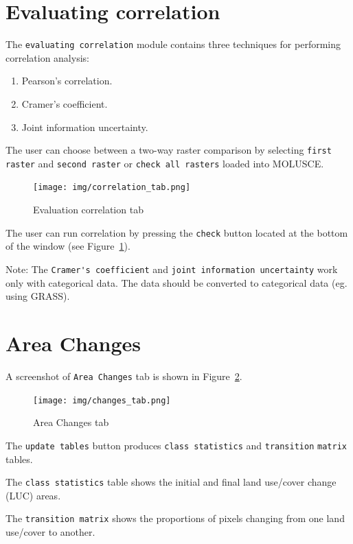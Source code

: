 \documentclass{report}
\begin{document}
\section{Evaluating correlation}

The \verb+evaluating correlation+ module contains three techniques for performing correlation analysis:
\begin{enumerate}
  \item Pearson's correlation.
  \item Cramer's coefficient.
  \item Joint information uncertainty.
\end{enumerate}

The user can choose between a two-way raster comparison by selecting \verb+first raster+ and \verb+second raster+
or \verb+check all rasters+ loaded into MOLUSCE.

\begin{figure}[h!]
\centering
\texttt{[image: img/correlation\_tab.png]}
\caption{Evaluation correlation tab}
\label{fig:correlation_tab}
\end{figure}

The user can run correlation by pressing the \verb+check+ button located at the bottom of the window (see Figure~\ref{fig:correlation_tab}).

Note: The \verb+Cramer's coefficient+ and \verb+joint information uncertainty+ work only with categorical data.
The data should be converted to categorical data (eg. using GRASS).

\section{Area Changes}

A screenshot of \verb+Area Changes+ tab is shown in Figure~\ref{fig:changes_tab}.

\begin{figure}[h!]
\centering
\texttt{[image: img/changes\_tab.png]}
\caption{Area Changes tab}
\label{fig:changes_tab}
\end{figure}

The \verb+update tables+ button produces \verb+class statistics+ and \verb+transition+ \verb+matrix+ tables.

The \verb+class statistics+ table shows the initial and final land use/cover change (LUC) areas.

The \verb+transition matrix+ shows the proportions of pixels changing from one land use/cover to another.
\end{document}
